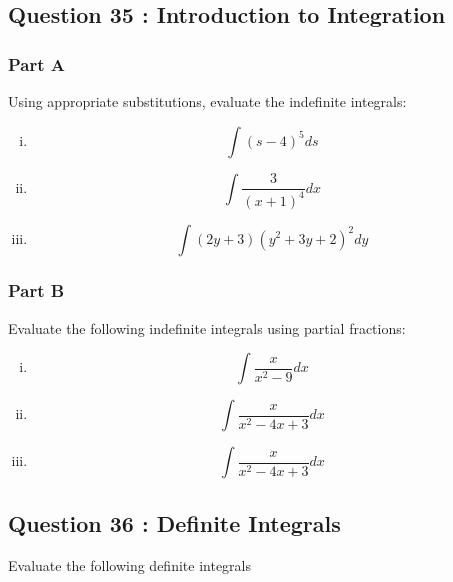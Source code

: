 \documentclass[]{article}
\begin{document}

\subsection*{Question 35 : Introduction to Integration}
\subsubsection*{Part A}
Using appropriate substitutions, evaluate the indefinite integrals:

\begin{multicols}{2}
	\begin{enumerate}[(i)]
		
		\item 
		\[ \int (s - 4)^5 ds \]
		\item 
		\[ \int 
		\frac{3}{(x + 1)^4 }dx\]
		\item 
		\[\int 
		(2y + 3)(y^2 + 3y + 2)^2 dy\]
		
	\end{enumerate}
\end{multicols}
\subsubsection*{Part B}
Evaluate the following indefinite integrals using partial fractions:
\begin{multicols}{2}
	\begin{enumerate}[(i)]
		
		\item \[ \int \frac{x}{x^2-9} dx  \]
		
		\item \[ \int \frac{x}{x^2 - 4x + 3} dx  \]
		
		\item \[ \int \frac{x}{x^2 - 4x + 3} dx  \]
		
	\end{enumerate}
\end{multicols}







\newpage
\subsection*{Question 36 : Definite Integrals}
Evaluate the following definite integrals 
\end{document}
